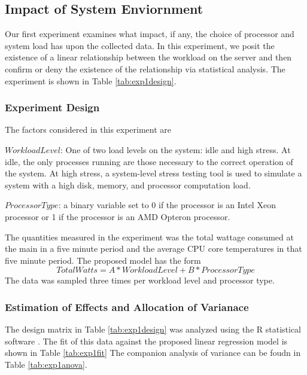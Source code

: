 \documentclass[times, 10pt,onecolumn]{article}
\begin{document}
\subsection{Impact of System Enviornment}
\label{sec:systemimpact}
Our first experiment examines what impact, if any, the choice of
processor and system load has upon the collected data.  In this
experiment, we posit the existence of a linear relationship between the
workload on the server and then confirm or deny the existence of the
relationship via statistical analysis.   The experiment is shown in
Table \ref{tab:exp1design}.

\subsubsection{Experiment Design}
\label{sec:exp1factors}
The factors considered in this experiment are
\begin{list}{}{}
\item $WorkloadLevel$: One of two load levels on the system: idle and
  high stress.   At idle, the only processes running are those necessary
  to the correct operation of the system.   At high stress, a
  system-level stress testing tool is used to simulate a system with a
  high disk, memory, and processor computation load.
\item $ProcessorType$: a binary variable set to 0 if the processor is
  an Intel Xeon processor or 1 if the processor is an AMD Opteron processor.
\end{list}
The quantities measured in the experiment was the total wattage consumed
at the main in a five minute period and the average CPU core
temperatures in that five minute period.  The proposed model has the
form
\begin{equation*}
  \label{eq:exp1model}
  TotalWatts = A*WorkloadLevel+B*ProcessorType
\end{equation*}
The data was sampled three times per workload level and processor type.


\subsubsection{Estimation of Effects and Allocation of Varianace}
\label{sec:expanonva}
The design matrix in Table \ref{tab:exp1design} was analyzed using the R
statistical software \cite{R2007}.  The fit of this data against the
proposed linear regression model is shown in Table \ref{tab:exp1fit}
The companion analysis of variance can be foudn in Table
\ref{tab:exp1anova}.
\end{document}
